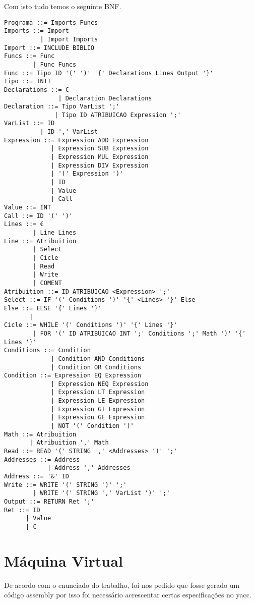 \documentclass[12pt,a4paper]{report}
\begin{document}
 
Com isto tudo temos o seguinte BNF.

\begin{lstlisting}
Programa ::= Imports Funcs
Imports ::= Import
          | Import Imports
Import ::= INCLUDE BIBLIO
Funcs ::= Func
        | Func Funcs
Func ::= Tipo ID '(' ')' '{' Declarations Lines Output '}'
Tipo ::= INTT
Declarations ::= €
               | Declaration Declarations
Declaration ::= Tipo VarList ';'
              | Tipo ID ATRIBUICAO Expression ';'
VarList ::= ID
          | ID ',' VarList
Expression ::= Expression ADD Expression
             | Expression SUB Expression
             | Expression MUL Expression
             | Expression DIV Expression
             | '(' Expression ')'
             | ID
             | Value
             | Call
Value ::= INT
Call ::= ID '(' ')'
Lines ::= €
        | Line Lines
Line ::= Atribuition
        | Select
        | Cicle
        | Read
        | Write
        | COMENT
Atribuition ::= ID ATRIBUICAO <Expression> ';'
Select ::= IF '(' Conditions ')' '{' <Lines> '}' Else
Else ::= ELSE '{' Lines '}'
       | 
Cicle ::= WHILE '(' Conditions ')' '{' Lines '}'
        | FOR '(' ID ATRIBUICAO INT ';' Conditions ';' Math ')' '{' Lines '}'
Conditions ::= Condition
             | Condition AND Conditions
             | Condition OR Conditions
Condition ::= Expression EQ Expression
             | Expression NEQ Expression
             | Expression LT Expression
             | Expression LE Expression
             | Expression GT Expression
             | Expression GE Expression
             | NOT '(' Condition ')'
Math ::= Atribuition
       | Atribuition ',' Math
Read ::= READ '(' STRING ',' <Addresses> ')' ';'
Addresses ::= Address
            | Address ',' Addresses
Address ::= '&' ID
Write ::= WRITE '(' STRING ')' ';'
        | WRITE '(' STRING ',' VarList ')' ';'
Output ::= RETURN Ret ';'
Ret ::= ID
      | Value
      | €
\end{lstlisting}
\section{Máquina Virtual}
De acordo com o enunciado do trabalho, foi nos pedido que fosse gerado um código assembly por isso foi necessário acrescentar certas especificações no yacc.
\end{document}
